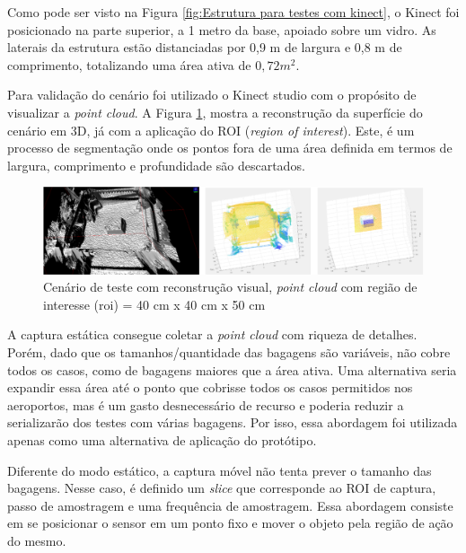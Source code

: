     
    
    Como pode ser visto na Figura \ref{fig:Estrutura para testes com kinect}, o Kinect foi posicionado na parte superior, a 1 metro da base, apoiado sobre um vidro. As laterais da estrutura estão distanciadas por 0,9 m de largura e 0,8 m de comprimento, totalizando uma área ativa de $0,72 m^2$.
    
    Para validação do cenário foi utilizado o Kinect studio com o propósito de visualizar a \textit{point cloud}. A Figura \ref{fig:cenarioTeste1}, mostra a reconstrução da superfície do cenário em 3D, já com a aplicação do ROI (\textit{region of interest}). Este, é um processo de segmentação onde os pontos fora de uma área definida em termos de largura, comprimento e profundidade são descartados.
    
        \begin{figure}[h]
           \centering
           \includegraphics[width=1\textwidth]{imagens/cenarioTeste!.png} 
           \caption{Cenário de teste com reconstrução visual, \textit{point cloud} com região de interesse (roi) = 40 cm x 40 cm x 50 cm}
          \label{fig:cenarioTeste1}
        \end{figure}
    
    A captura estática consegue coletar a \textit{point cloud} com riqueza de detalhes. Porém, dado que os tamanhos/quantidade das bagagens são variáveis, não cobre todos os casos, como de bagagens maiores que a área ativa. Uma alternativa seria expandir essa área até o ponto que cobrisse todos os casos permitidos nos aeroportos, mas é um gasto desnecessário de recurso e poderia reduzir a serializarão dos testes com várias bagagens. Por isso, essa abordagem foi utilizada apenas como uma alternativa de aplicação do protótipo. 
    


    Diferente do modo estático, a captura móvel não tenta prever o tamanho das bagagens. Nesse caso, é definido um \textit{slice} que corresponde ao ROI de captura, passo de amostragem e uma frequência de amostragem. Essa abordagem consiste em se posicionar o sensor em um ponto fixo e mover o objeto pela região de ação do mesmo.
    
